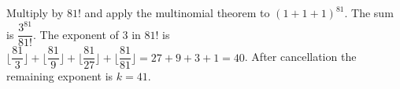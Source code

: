 Multiply by $81!$ and apply the multinomial theorem to $(1+1+1)^{81}$. The sum is $\dfrac{3^{81}}{81!}$. The exponent of $3$ in $81!$ is $\lfloor \dfrac{81}{3} \rfloor + \lfloor \dfrac{81}{9} \rfloor + \lfloor \dfrac{81}{27} \rfloor + \lfloor \dfrac{81}{81} \rfloor = 27 + 9 + 3 + 1 = 40$. After cancellation the remaining exponent is $\boxed{k=41}$.
